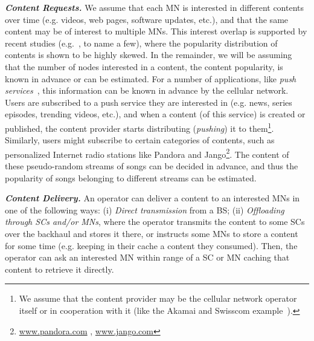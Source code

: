 \documentclass[10pt,conference,letterpaper]{IEEEtran}
\begin{document}
\textbf{\textit{Content Requests.}} We assume that each MN is interested in different contents over time (e.g. videos, web pages, software updates, etc.), and that the same content may be of interest to multiple MNs. This interest overlap is supported by recent studies (e.g.~\cite{youtube-traffic-from-edge,top-video-cellular,pptv-mobile-vod}, to name a few), where the popularity distribution of contents is shown to be highly skewed. In the remainder, we will be assuming that the number of nodes interested in a content, the content popularity, is known in advance or can be estimated. For a number of applications, like \textit{push services}~\cite{fluid-limit-mass2012}, this information can be known in advance by the cellular network. Users are subscribed to a push service they are interested in (e.g. news, series episodes, trending videos, etc.), and when a content (of this service) is created or published, the content provider starts distributing (\textit{pushing}) it to them\footnote{We assume that the content provider may be the cellular network operator itself or in cooperation with it (like the Akamai and Swisscom example~\cite{akamai-swisscom}).}.  Similarly, users might subscribe to certain categories of contents, such as personalized Internet radio stations like Pandora and Jango\footnote{\url{www.pandora.com} , \url{www.jango.com}}. The content of these pseudo-random streams of songs can be decided in advance, and thus the popularity of songs belonging to different streams can be estimated. 


\textbf{\textit{Content Delivery.}} An operator can deliver a content to an interested MNs in one of the following ways: (i) \textit{Direct transmission} from a BS; (ii) \textit{Offloading through SCs and/or MNs}, where the operator transmits the content to some SCs over the backhaul and stores it there, or instructs some MNs to store a content for some time (e.g. keeping in their cache a content they consumed). Then, the operator can ask an interested MN within range of a SC or MN caching that content to retrieve it directly.
\end{document}
